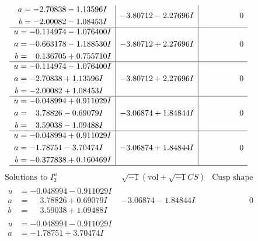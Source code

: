 \documentclass[1p]{elsarticle_modified}
\theoremstyle{definition}
\newcommand{\I}{\sqrt{-1}}
\begin{document}
$$\begin{array}{c|c|c}
\begin{aligned}
a &= -2.70838 - 1.13596 I \\
b &= -2.00082 - 1.08453 I\end{aligned}
 & -3.80712 - 2.27696 I & \phantom{-0.000000 } 0 \\ \hline\begin{aligned}
u &= -0.114974 - 1.076400 I \\
a &= -0.663178 - 1.188530 I \\
b &= \phantom{-}0.136705 + 0.755710 I\end{aligned}
 & -3.80712 + 2.27696 I & \phantom{-0.000000 } 0 \\ \hline\begin{aligned}
u &= -0.114974 - 1.076400 I \\
a &= -2.70838 + 1.13596 I \\
b &= -2.00082 + 1.08453 I\end{aligned}
 & -3.80712 + 2.27696 I & \phantom{-0.000000 } 0 \\ \hline\begin{aligned}
u &= -0.048994 + 0.911029 I \\
a &= \phantom{-}3.78826 - 0.69079 I \\
b &= \phantom{-}3.59038 - 1.09488 I\end{aligned}
 & -3.06874 + 1.84844 I & \phantom{-0.000000 } 0 \\ \hline\begin{aligned}
u &= -0.048994 + 0.911029 I \\
a &= -1.78751 - 3.70474 I \\
b &= -0.377838 + 0.160469 I\end{aligned}
 & -3.06874 + 1.84844 I & \phantom{-0.000000 } 0\\
 \hline 
 \end{array}$$\newpage$$\begin{array}{c|c|c}  
\text{Solutions to }I^u_{2}& \I (\text{vol} + \sqrt{-1}CS) & \text{Cusp shape}\\
 \hline 
\begin{aligned}
u &= -0.048994 - 0.911029 I \\
a &= \phantom{-}3.78826 + 0.69079 I \\
b &= \phantom{-}3.59038 + 1.09488 I\end{aligned}
 & -3.06874 - 1.84844 I & \phantom{-0.000000 } 0 \\ \hline\begin{aligned}
u &= -0.048994 - 0.911029 I \\
a &= -1.78751 + 3.70474 I \\

\end{aligned}
\end{array}$$
\end{document}
